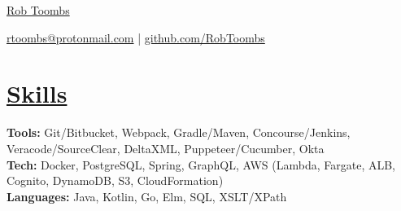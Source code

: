 \documentclass[10pt,letterpaper]{article}
\begin{document}

\centerline{\Huge \href{https://www.reddit.com/r/EngineeringResumes/wiki/index}{Rob Toombs}}

\vspace{5pt}


\centerline{\href{https://www.reddit.com/r/EngineeringResumes/wiki/index\#wiki_contact_information}{rtoombs@protonmail.com} | \href{https://www.reddit.com/r/EngineeringResumes/wiki/index\#wiki_portfolios}{github.com/RobToombs}}

\vspace{-10pt}


\section*{\href{https://www.reddit.com/r/EngineeringResumes/wiki/index\#wiki_skills}{Skills}}
\textbf{Tools:} Git/Bitbucket, Webpack, Gradle/Maven, Concourse/Jenkins, Veracode/SourceClear, DeltaXML, Puppeteer/Cucumber, Okta \\
\textbf{Tech:} Docker, PostgreSQL, Spring, GraphQL, AWS (Lambda, Fargate, ALB, Cognito, DynamoDB, S3, CloudFormation)  \\
\textbf{Languages:} Java, Kotlin, Go, Elm, SQL, XSLT/XPath

\vspace{-6.5pt}

\end{document}
